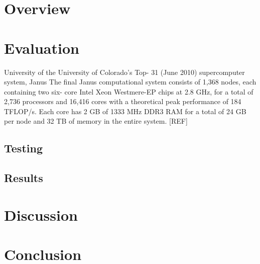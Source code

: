 \documentclass{article}
\begin{document}
\section{Overview}

\section{Evaluation}
University of the University of Colorado's Top-
31 (June 2010) supercomputer system, Janus
The final Janus computational
system consists of 1,368 nodes, each containing two six-
core Intel Xeon Westmere-EP chips at 2.8 GHz, for a total
of 2,736 processors and 16,416 cores with a theoretical
peak performance of 184 TFLOP/s. Each core has 2
GB of 1333 MHz DDR3 RAM for a total of 24 GB per
node and 32 TB of memory in the entire system. [REF]

\subsection{Testing}

\subsection{Results}

\section{Discussion}


\section{Conclusion}



\end{document}

